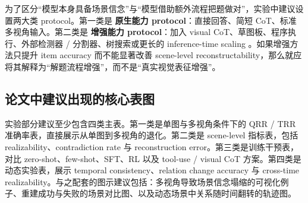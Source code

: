 为了区分“模型本身具备场景信念”与“模型借助额外流程把题做对”，实验中建议设置两大类 protocol。第一类是 \textbf{原生能力 protocol}：直接回答、简短 CoT、标准多视角输入。第二类是 \textbf{增强能力 protocol}：加入 visual CoT、草图板、程序执行、外部检测器 / 分割器、树搜索或更长的 inference-time scaling \cite{hu2024visualsketchpad,wang2025visuothink,lin2025multimodalcot,suris2023vipergpt,gui2024vpd}。如果增强方法只提升 item accuracy 而不能显著改善 scene-level reconstructability，那么就应将其解释为“解题流程增强”，而不是“真实视觉表征增强”。

\subsection{论文中建议出现的核心表图}

实验部分建议至少包含四类主表。第一类是单图与多视角条件下的 QRR / TRR 准确率表，直接展示从单图到多视角的退化。第二类是 scene-level 指标表，包括 realizability、contradiction rate 与 reconstruction error。第三类是训练干预表，对比 zero-shot、few-shot、SFT、RL 以及 tool-use / visual CoT 方案。第四类是动态实验表，展示 temporal consistency、relation change accuracy 与 cross-time realizability。与之配套的图示建议包括：多视角导致场景信念塌缩的可视化例子、重建成功与失败的场景对比图、以及动态场景中关系随时间翻转的轨迹图。
